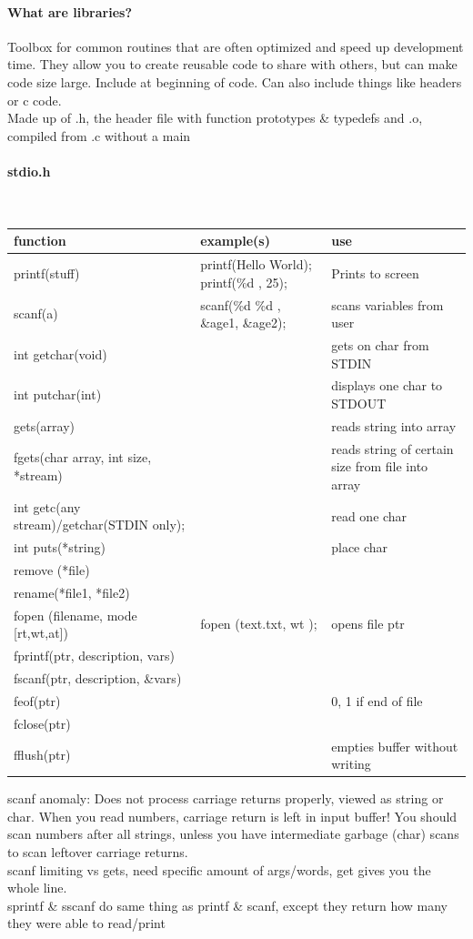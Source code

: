 \documentclass[12 pt]{article}
\begin{document}
\paragraph{What are libraries?} Toolbox for common routines that are often optimized and speed up development time. They allow you to create reusable code to share with others, but can make code size large. Include at beginning of code. Can also include things like headers or c code.
\\ Made up of .h, the header file with function prototypes \& typedefs and .o, compiled from .c without a main
\paragraph{stdio.h}~
\begin{tabularx}{\textwidth}{|X|X|X|}
	\hline \textbf{function} & \textbf{example(s)} & \textbf{use}
	\\\hline printf(\textquotedbl stuff\textquotedbl) & printf(\textquotedbl Hello World\textquotedbl); printf(\textquotedbl \%d \textquotedbl, 25); & Prints to screen
	\\\hline scanf(a) & scanf(\textquotedbl \%d \%d \textquotedbl, \&age1, \&age2); & scans variables from user
	\\\hline int getchar(void) & & gets on char from STDIN
	\\\hline int putchar(int) && displays one char to STDOUT
	\\\hline gets(array) && reads string into array
	\\\hline fgets(char array, int size, *stream) && reads string of certain size from file into array
	\\\hline int getc(any stream)/getchar(STDIN only); && read one char
	\\\hline int puts(*string) && place char
	\\\hline remove (*file) &&
	\\\hline rename(*file1, *file2) &&
	\\\hline fopen (filename, mode [rt,wt,at]) & fopen (text.txt, \textquotedbl wt \textquotedbl); & opens file ptr
	\\\hline fprintf(ptr, description, vars) &&
	\\\hline fscanf(ptr, description, \&vars) &&
	\\\hline feof(ptr) && 0, 1 if end of file
	\\\hline fclose(ptr) &&
	\\\hline fflush(ptr) && empties buffer without writing
	\\\hline
\end{tabularx}
scanf anomaly: Does not process carriage returns properly, viewed as string or char. When you read numbers, carriage return is left in input buffer! You should scan numbers after all strings, unless you have intermediate garbage (char) scans to scan leftover carriage returns.
\\scanf limiting vs gets, need specific amount of args/words, get gives you the whole line.
\\sprintf \& sscanf do same thing as printf \& scanf, except they return how many they were able to read/print
\end{document}

